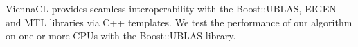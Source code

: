 \documentclass{report}
\begin{document}
ViennaCL provides seamless interoperability with the Boost::UBLAS, EIGEN and MTL libraries via C++ templates. We test the performance of our algorithm on one or more CPUs with the Boost::UBLAS library. 


%
%






%
\end{document}
